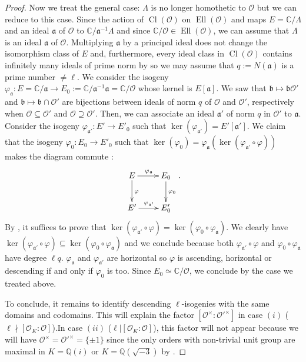 \documentclass[a4paper,10pt,notitlepage]{report}
\theoremstyle{definition}
\theoremstyle{plain}
\theoremstyle{definition}
\newcommand{\Q}{\mathbb{Q}}
\newcommand{\C}{\mathbb{C}}
\newcommand{\mO}{\mathcal{O}}
\renewcommand{\(}{\left(}
\renewcommand{\)}{\right)}
\newcommand{\mf}[1]{\mathfrak{#1}}
\DeclareMathOperator{\Cl}{Cl}
\DeclareMathOperator{\Ell}{Ell}
\begin{document}
\begin{proof}
Now we treat the general case: $\Lambda$ is no longer homothetic to $\mO$ but we can reduce to this case. Since the action of $\Cl(\mO)$ on $\Ell(\mO)$ and maps $E=\C/\Lambda$ and an ideal $\mf{a}$ of $\mO$ to $\C/\mf{a}^{-1}\Lambda$ and since $\C/\mO\in\Ell(\mO)$, we can assume that $\Lambda$ is an ideal $\mf{a}$ of $\mO$.  Multiplying $\mf{a}$ by a principal ideal does not change the isomorphism class of $E$ and, furthermore, every ideal class in $\Cl(\mO)$ contains infinitely many ideals of prime norm by \cite[Theorems 7.7. (iii) and 9.12]{Cox} so we may assume that $q:=N(\mf{a})$ is a prime number $\neq\ell$.  We consider the isogeny $\varphi_{\mf{a}}:E=\C/\mf{a}\longrightarrow E_0:=\C/\mf{a}^{-1}\mf{a}=\C/\mO$ whose kernel is $E[\mf{a}]$. We saw that $\mf{b}\longmapsto\mf{b}\mO'$ and $\mf{b}\longmapsto\mf{b}\cap\mO'$ are bijections between ideals of norm $q$ of $\mO$ and $\mO'$, respectively when $\mO\subseteq\mO'$ and $\mO\supseteq\mO'$.  Then, we can associate an ideal $\mf{a}'$ of norm $q$ in $\mO'$ to $\mf{a}$. Consider the isogeny $\varphi_{\mf{a}'}:E'\longrightarrow E'_0$ such that $\ker(\varphi_{\mf{a}'})=E'[\mf{a}']$. We claim that the isogeny $\varphi_0 : E_0\longrightarrow E'_0$ such that $\ker(\varphi_0)=\varphi_{\mf{a}}(\ker(\varphi_{\mf{a}'}\circ\varphi))$ makes the diagram commute :
\[\xymatrix{
E \ar[d]^{\varphi} \ar[r]^{\varphi_{\mf{a}}} & E_0 \ar[d]^{\varphi_0} \\
E' \ar[r]^{\varphi_{\mf{a}'}} & E'_0
}.\]
By \cite[Corollary III.4.11]{Silverman1}, it suffices to prove that $\ker(\varphi_{\mf{a}'}\circ\varphi)=\ker(\varphi_0\circ \varphi_{\mf{a}})$. We clearly have $\ker(\varphi_{\mf{a}'}\circ\varphi)\subseteq \ker(\varphi_0\circ \varphi_{\mf{a}})$ and we conclude because both $\varphi_{\mf{a}'}\circ\varphi$ and $\varphi_0\circ \varphi_{\mf{a}}$ have degree $\ell q$.  $\varphi_{\mf{a}}$ and $\varphi_{\mf{a}'}$ are horizontal so $\varphi$ is ascending, horizontal or descending if and only if $\varphi_0$ is too. Since $E_0\simeq\C/\mO$, we conclude by the case we treated above.

To conclude, it remains to identify descending $\ell$-isogenies with the same domains and codomains. This will explain the factor $[\mO^\times:\mO'^\times]$ in case $(i)$ ($\ell\nmid [\mO_K:\mO]$).In case $(ii)$ ($\ell|[\mO_K:\mO]$), this factor will not appear because we will have $\mO^\times=\mO'^\times=\{\pm 1\}$ since the only orders with non-trivial unit group are maximal in $K=\Q(i)$ or $K=\Q(\sqrt{-3})$ by \cite[Exercise 5.9]{Cox}.


\end{proof}
\end{document}
